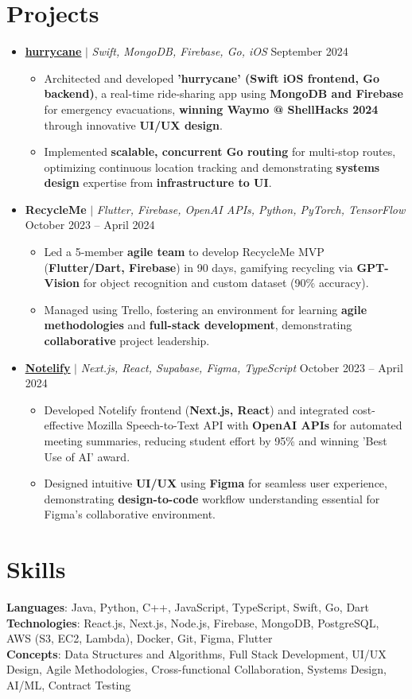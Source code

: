 \documentclass[letterpaper,11pt]{article}
\newcommand{\resumeItem}[1]{
  \item\small{
    {#1 \vspace{-2pt}}
  }
}
\newcommand{\resumeProjectHeading}[2]{
  \item
  \small#1 \hfill #2 \\
  \vspace{-7pt} %
}
\newcommand{\resumeSubHeadingListStart}{\begin{itemize}[leftmargin=0.15in, label={}]}
\newcommand{\resumeSubHeadingListEnd}{\end{itemize}}
\newcommand{\resumeItemListStart}{\begin{itemize}}
\newcommand{\resumeItemListEnd}{\end{itemize}\vspace{-5pt}}
\begin{document}
\section{Projects}
    \resumeSubHeadingListStart
    \resumeProjectHeading
          {\underline{\textbf {\href{https://github.com/keshavbabu/shellhacks/tree/main}{hurrycane}}} $|$ \emph{Swift, MongoDB, Firebase, Go, iOS}}{September 2024}
          \resumeItemListStart
            \resumeItem{Architected and developed \textbf{'hurrycane' (Swift iOS frontend, Go backend)}, a real-time ride-sharing app using \textbf{MongoDB and Firebase} for emergency evacuations, \textbf{winning Waymo @ ShellHacks 2024} through innovative \textbf{UI/UX design}.}
            \resumeItem{Implemented \textbf{scalable, concurrent Go routing} for multi-stop routes, optimizing continuous location tracking and demonstrating \textbf{systems design} expertise from \textbf{infrastructure to UI}.}
          \resumeItemListEnd
      \resumeProjectHeading
          {\textbf{RecycleMe} $|$ \emph{Flutter, Firebase, OpenAI APIs, Python, PyTorch, TensorFlow}}{October 2023 -- April 2024}
          \resumeItemListStart
            \resumeItem{Led a 5-member \textbf{agile team} to develop RecycleMe MVP (\textbf{Flutter/Dart, Firebase}) in 90 days, gamifying recycling via \textbf{GPT-Vision} for object recognition and custom dataset (90\% accuracy).}
            \resumeItem{Managed using Trello, fostering an environment for learning \textbf{agile methodologies} and \textbf{full-stack development}, demonstrating \textbf{collaborative} project leadership.}
          \resumeItemListEnd
      \resumeProjectHeading
          {\underline{\textbf {\href{https://www.notelify.co/}{Notelify}}} $|$ \emph{Next.js, React, Supabase, Figma, TypeScript}}{October 2023 -- April 2024}
          \resumeItemListStart
            \resumeItem{Developed Notelify frontend (\textbf{Next.js, React}) and integrated cost-effective Mozilla Speech-to-Text API with \textbf{OpenAI APIs} for automated meeting summaries, reducing student effort by 95\% and winning 'Best Use of AI' award.}
            \resumeItem{Designed intuitive \textbf{UI/UX} using \textbf{Figma} for seamless user experience, demonstrating \textbf{design-to-code} workflow understanding essential for Figma's collaborative environment.}
          \resumeItemListEnd
    \resumeSubHeadingListEnd

\section{Skills}
 \begin{itemize}[leftmargin=0.15in, label={}]
    \small{\item{
     \textbf{Languages}{: Java, Python, C++, JavaScript, TypeScript, Swift, Go, Dart} \\
     \textbf{Technologies}{: React.js, Next.js, Node.js, Firebase, MongoDB, PostgreSQL, AWS (S3, EC2, Lambda), Docker, Git, Figma, Flutter} \\
     \textbf{Concepts}{: Data Structures and Algorithms, Full Stack Development, UI/UX Design, Agile Methodologies, Cross-functional Collaboration, Systems Design, AI/ML, Contract Testing} }}
 \end{itemize}
 
%
\end{document}
